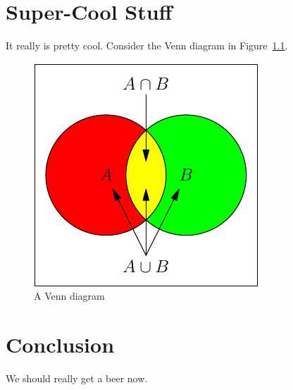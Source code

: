 \documentclass[12pt,openany,oneside]{report}
\begin{document}
\chapter{Super-Cool Stuff}

It really is pretty cool.  Consider the Venn diagram in Figure~\ref{venn}.

\begin{figure}[htbp]
  \begin{center}        
    \includegraphics{venn}
    \caption{A Venn diagram}
    \label{venn}
  \end{center}
\end{figure}



\chapter{Conclusion}

We should really get a beer now.

\singlespacing
{

}

\vfill
\textheight 9in
\eject
\topmargin -1in
\clearpage
{}
{}
\printindex
\end{document}
